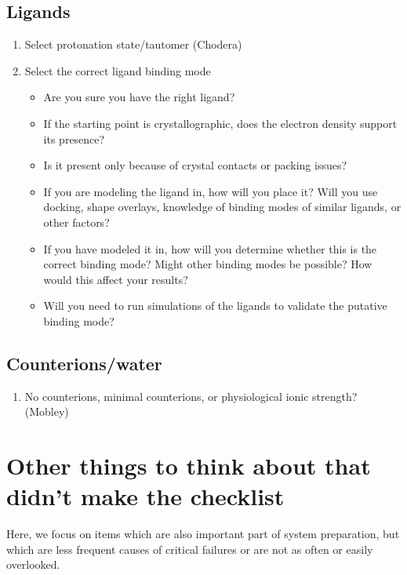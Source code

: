 \documentclass[9pt]{livecoms}
\begin{document}
\subsection{Ligands}

\begin{enumerate}
\item Select protonation state/tautomer (Chodera)
\item Select the correct ligand binding mode %
    \begin{itemize}
    \item Are you sure you have the right ligand?
    \item If the starting point is crystallographic, does the electron density support its presence? 
    \item Is it present only because of crystal contacts or packing issues?
    \item If you are modeling the ligand in, how will you place it? %
Will you use docking, shape overlays, knowledge of binding modes of similar ligands, or other factors?
    \item If you have modeled it in, how will you determine whether this is the correct binding mode? Might other binding modes be possible? How would this affect your results?
    \item Will you need to run simulations of the ligands to validate the putative binding mode?
    \end{itemize}
\end{enumerate}

\subsection{Counterions/water}

\begin{enumerate}
\item No counterions, minimal counterions, or physiological ionic strength? (Mobley)

\end{enumerate}

\section{Other things to think about that didn't make the checklist}

Here, we focus on items which are also important part of system preparation, but which are less frequent causes of critical failures or are not as often or easily overlooked.
\end{document}
